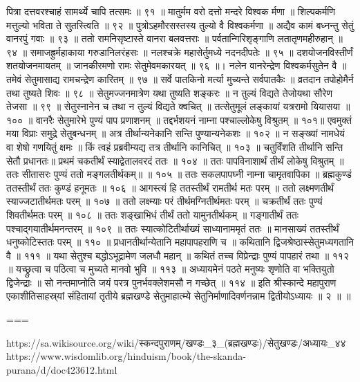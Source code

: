 पित्रा दत्तवरश्चाहं सामर्थ्ये चापि तत्समः ॥ ९१ ॥
मातुर्मम वरो दत्तो मन्दरे विश्वक र्मणा ॥
शिल्पकर्मणि मत्तुल्यो भविता ते सुतस्त्विति ॥ ९२ ॥
पुत्रोऽहमौरसस्तस्य तुल्यो वै विश्वकर्मणा ॥
अद्यैव कामं बध्नन्तु सेतुं वानरपुं गवाः ॥ ९३ ॥
ततो रामनिसृष्टास्ते वानरा बलवत्तराः ॥
पर्वतान्गिरिशृङ्गाणि लतातृणमहीरुहान् ॥ ९४ ॥
समाजह्रुर्महाकाया गरुडानिलरंहसः ॥
नलश्चक्रे महासेर्तुमध्ये नदनदीपतेः ॥ ९५ ॥
दशयोजनविस्तीर्णं शतयोजनमायतम् ॥
जानकीरमणो रामः सेतुमेवमकारयत् ॥ ९६ ॥।
नलेन वानरेन्द्रेण विश्वकर्मसुतेन वै ॥
तमेवं सेतुमासाद्य रामचन्द्रेण कारितम् ॥ ९७ ॥
सर्वे पातकिनो मर्त्या मुच्यन्ते सर्वपातकैः ॥
व्रतदान तपोहोमैर्न तथा तुष्यते शिवः ॥ ९८ ॥
सेतुमज्जनमात्रेण यथा तुष्यति शङ्करः ॥
न तुल्यं विद्यते तेजोयथा सौरेण तेजसा ॥ ९९ ॥
सेतुस्नानेन च तथा न तुल्यं विद्यते क्वचित् ॥
तत्सेतुमूलं लङ्कायां यत्ररामो यियासया ॥ १०० ॥
वानरैः सेतुमारेभे पुण्यं पाप प्रणाशनम् ॥
तद्दर्भशयनं नाम्ना पश्चाल्लोकेषु विश्रुतम् ॥ १०१॥
एवमुक्तं मया विप्राः समुद्रे सेतुबन्धनम् ॥
अत्र तीर्थान्यनेकानि सन्ति पुण्यान्यनेकशः ॥ १०२ ॥
न सङ्ख्यां नामधेयं वा शेषो गणयितुं क्षमः ॥
किं त्वहं प्रब्रवीम्यद्य तत्र तीर्थानि कानिचित् ॥ १०३ ॥
चतुर्विंशति तीर्थानि सन्ति सेतौ प्रधानतः॥
प्रथमं चकतीर्थं स्याद्वेतालवरदं ततः ॥ १०४ ॥
ततः पापविनाशार्थं तीर्थं लोकेषु विश्रुतम् ॥
ततः सीतासरः पुण्यं ततो मङ्गलतीर्थकम्॥ ॥ १०५ ॥
ततः सकलपापघ्नी नाम्ना चामृतवापिका ॥
ब्रह्मकुण्डं ततस्तीर्थं ततः कुण्डं हनूमतः ॥ १०६ ॥
आगस्त्यं हि ततस्तीर्थं रामतीर्थ मतः परम् ॥
ततो लक्ष्मणतीर्थं स्याज्जटातीर्थमतः परम् ॥ १०७ ॥
ततो लक्ष्म्याः परं तीर्थमग्नितीर्थमतः परम् ॥
चक्रतीर्थं ततः पुण्यं शिवतीर्थमतः परम् ॥ १०८ ॥
ततः शङ्खाभिधं तीर्थं ततो यामुनतीर्थकम् ॥
गङ्गातीर्थं ततः पश्चाद्गयातीर्थमनन्तरम् ॥ १०९ ॥
ततः स्यात्कोटितीर्थाख्यं साध्यानाममृतं ततः ॥
मानसाख्यं ततस्तीर्थं धनुष्कोटिस्ततः परम् ॥ ११० ॥
प्रधानतीर्थान्येतानि महापापहराणि च ॥
कथितानि द्विजश्रेष्ठास्सेतुमध्यगतानि वै ॥ १११ ॥
यथा सेतुश्च बद्धोऽभूद्रामेण जलधौ महान् ॥
कथितं तच्च विप्रेन्द्राः पुण्यं पापहारं तथा ॥ ११२ ॥
यच्छ्रुत्वा च पठित्वा च मुच्यते मानवो भुवि ॥ ११३ ॥
अध्यायमेनं पठते मनुष्यः शृणोति वा भक्तियुतो द्विजेन्द्राः ॥
सो नन्तमाप्नोति जयं परत्र पुनर्भवक्लेशमसौ न गच्छेत् ॥ ११४ ॥
इति श्रीस्कान्दे महापुराण एकाशीतिसाहस्र्यां संहितायां तृतीये ब्रह्मखण्डे सेतुमाहात्म्ये सेतुनिर्माणादिवर्णनन्नाम द्वितीयोऽध्यायः ॥ २ ॥ ॥


===

https://sa.wikisource.org/wiki/स्कन्दपुराणम्/खण्डः_३_(ब्रह्मखण्डः)/सेतुखण्डः/अध्यायः_४४
https://www.wisdomlib.org/hinduism/book/the-skanda-purana/d/doc423612.html


